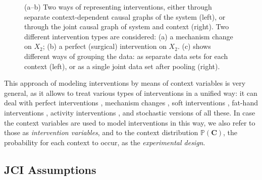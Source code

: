 \documentclass[twoside,11pt]{article}
\newcommand{\Prb}{\mathbb{P}}
\newcommand\B[1]{\bm{#1}}
\begin{document}
\begin{figure}[t]
  \caption{(a--b) Two ways of representing interventions, either through separate context-dependent causal graphs of the system (left), or through the joint causal graph of system and context (right). Two different intervention types are considered: (a) a mechanism change on $X_2$; (b) a perfect (surgical) intervention on $X_2$. (c) shows different ways of grouping the data: as separate data sets for each context (left), or as a single joint data set after pooling (right).\label{fig:JCI_example}}
\end{figure}

This approach of modeling interventions by means of context variables is very general,
as it allows to treat various types of interventions in a unified way: it can deal with perfect interventions \citep{Pearl2009}, mechanism changes \citep{TianPearl2001}, soft interventions \citep{Markowetz++2005}, fat-hand interventions \citep{EatonMurphy07}, activity interventions \citep{MooijHeskes_UAI_13}, and stochastic versions of all these. 
In case the context variables are used to model interventions in this way, we also refer to those as \emph{intervention variables},
and to the context distribution $\Prb(\B{C})$, the probability for each context to occur, as the \emph{experimental design}.

\subsection{JCI Assumptions}\label{sec:JCI_assumptions}
\end{document}
